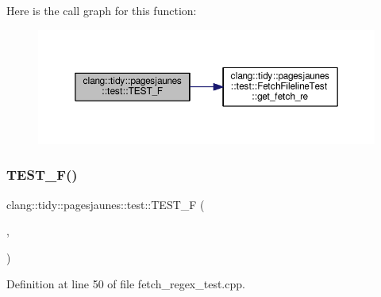 Here is the call graph for this function\+:
\nopagebreak
\begin{figure}[H]
\begin{center}
\leavevmode
\includegraphics[width=350pt]{namespaceclang_1_1tidy_1_1pagesjaunes_1_1test_a10fd631fb59f61de469bea299040db9e_cgraph}
\end{center}
\end{figure}
\mbox{\label{namespaceclang_1_1tidy_1_1pagesjaunes_1_1test_af73c5ad3ee3e0701c44689229929623e}} 
\subsubsection{\texorpdfstring{T\+E\+S\+T\+\_\+\+F()}{TEST\_F()}\hspace{0.1cm}{\footnotesize\ttfamily [6/57]}}
{\footnotesize\ttfamily clang\+::tidy\+::pagesjaunes\+::test\+::\+T\+E\+S\+T\+\_\+F (\begin{DoxyParamCaption}\item[{\hyperlink{classclang_1_1tidy_1_1pagesjaunes_1_1test_1_1_fetch_regex_test}{Fetch\+Regex\+Test}}]{,  }\item[{Regex\+Matching\+Indicators}]{ }\end{DoxyParamCaption})}



Definition at line 50 of file fetch\+\_\+regex\+\_\+test.\+cpp.


